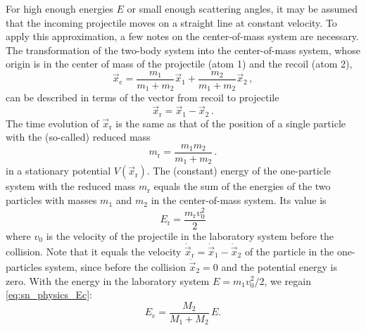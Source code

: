 For high enough energies $E$ or small enough scattering angles, it may be assumed that the incoming projectile moves on a straight line at constant velocity.
To apply this approximation, a few notes on the center-of-mass system are necessary.
The transformation of the two-body system into the center-of-mass system, whose origin is in the center of mass of the projectile (atom 1) and the recoil (atom 2),
%
\begin{equation}
    \label{eq:sn_center-of-mass}
    \vec{x}_\mathrm{c} = \frac{m_1}{m_1+m_2} \vec{x}_1 + \frac{m_2}{m_1+m_2} \vec{x}_2 \, ,
\end{equation}
%
can be described in terms of the vector from recoil to projectile
%
\begin{equation}
    \label{eq:sn_vector_21}
    \vec{x}_\mathrm{r} = \vec{x}_1 - \vec{x}_2 \, .
\end{equation}
%
The time evolution of $\vec{x}_\mathrm{r}$ is the same as that of the position of a single particle with the (so-called) reduced mass
%
\begin{equation}
    \label{eq:sn_reduced_mass}
    m_\mathrm{r} = \frac{m_1 m_2}{m_1 + m_2} \, .
\end{equation}
%
in a stationary potential $V(\vec{x}_\mathrm{r})$.
The (constant) energy of the one-particle system with the reduced mass $m_\mathrm{r}$ equals the sum of the energies of the two particles with masses $m_1$ and $m_2$ in the center-of-mass system. Its value is
%
\begin{equation}
    \label{eq:sn_reduced_energy1}
    E_\mathrm{r} = \frac{ m_\mathrm{r} v_0^2}{ 2 }
\end{equation}
%
where $v_0$ is the velocity of the projectile in the laboratory system before the collision.
Note that it equals the velocity $\dot{\vec{x}}_\mathrm{r} = \dot{\vec{x}}_1 - \dot{\vec{x}}_2$ of the particle in the one-particles system, since before the collision $\dot{\vec{x}}_2 = 0$ and the potential energy is zero.
With the energy in the laboratory system $E = m_1 v_0^2/2$, we regain \cref{eq:sn_physics_Ec}:
%
\begin{equation*}
    E_\mathrm{c} = \frac{M_2}{M_1 + M_2} \, E .
\end{equation*}

